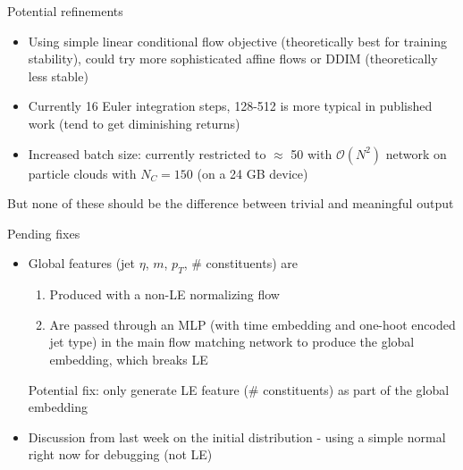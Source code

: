 \documentclass[handout, aspectratio=169,xcolor=dvipsnames]{beamer}
\begin{document}
\begin{frame}{Potential refinements}
    \begin{itemize}
        \item Using simple linear conditional flow objective (theoretically best for training stability), could try more sophisticated affine flows \cite{lipmanFlowMatchingGuide2024} or DDIM (theoretically less stable)
        \item Currently 16 Euler integration steps, 128-512 is more typical in published work (tend to get diminishing returns)
        \item Increased batch size: currently restricted to $\approx$ 50 with $\mathcal{O}(N^2)$ network on particle clouds with $N_C=150$ (on a 24 GB device)
    \end{itemize}
    But none of these should be the difference between trivial and meaningful output 
\end{frame}


\begin{frame}{Pending fixes}
    \begin{itemize}
        \item Global features (jet $\eta$, $m$, $p_T$, \# constituents) are \begin{enumerate}
            \item Produced with a non-LE normalizing flow
            \item Are passed through an MLP (with time embedding and one-hoot encoded jet type) in the main flow matching network to produce the global embedding, which breaks LE
        \end{enumerate}
        Potential fix: only generate LE feature (\# constituents) as part of the global embedding
        \item Discussion from last week on the initial distribution - using a simple normal right now for debugging (not LE)
    \end{itemize}
\end{frame}
\end{document}
